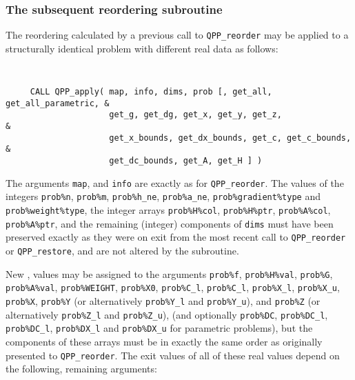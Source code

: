 \documentclass{galahad}
\newcommand{\packagename}{QPP}
\begin{document}

\subsubsection{The subsequent reordering subroutine}
The reordering calculated by a previous call to {\tt \packagename\_reorder}
may be applied to a structurally identical problem with different real data
as follows:

\vspace*{-2mm}
{\tt
\begin{verbatim}
     CALL QPP_apply( map, info, dims, prob [, get_all, get_all_parametric, &
                     get_g, get_dg, get_x, get_y, get_z,                   &
                     get_x_bounds, get_dx_bounds, get_c, get_c_bounds,     &
                     get_dc_bounds, get_A, get_H ] )
\end{verbatim}
}
\vspace*{-1mm}
\noindent
The arguments {\tt map}, and {\tt info} are exactly as for
{\tt \packagename\_reorder}. The values of the integers
{\tt prob\%n}, {\tt prob\%m}, {\tt prob\%h\_ne}, {\tt prob\%a\_ne},
{\tt prob\%gradient\%type} and {\tt prob\%weight\%type}, the
integer arrays {\tt prob\%H\%col}, {\tt prob\%H\%ptr},
{\tt prob\%A\%col}, {\tt prob\%A\%ptr}, and the remaining (integer)
components of {\tt dims} must
have been preserved exactly as they were on exit from the most recent
call to {\tt \packagename\_reorder} or {\tt \packagename\_restore},
and are not altered by the subroutine.

New \realdp, values may be assigned to the arguments
{\tt prob\%f}, {\tt prob\%H\%val}, {\tt prob\%G}, {\tt prob\%A\%val},
{\tt prob\%WEIGHT}, {\tt prob\%X0}, {\tt prob\%C\_l},
{\tt prob\%C\_l}, {\tt prob\%X\_l}, {\tt prob\%X\_u}, {\tt prob\%X},
{\tt prob\%Y}
(or alternatively {\tt prob\%Y\_l} and {\tt prob\%Y\_u}),
and {\tt prob\%Z}
(or alternatively {\tt prob\%Z\_l} and {\tt prob\%Z\_u}),
(and optionally
{\tt prob\%DC}, {\tt prob\%DC\_l}, {\tt prob\%DC\_l}, {\tt prob\%DX\_l} and
{\tt prob\%DX\_u} for parametric problems),
but the components of these arrays
must be in exactly the same order as originally presented to
{\tt \packagename\_reorder}.
The exit values of all of these real values depend on the following,
remaining arguments:
\end{document}
